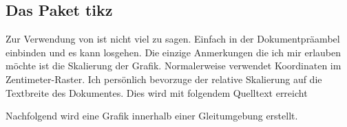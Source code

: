 \documentclass[%
  english,ngerman,%
  geometry=no,DIV=12,automark,%
]{tudscrartcl}
\begin{document}
\subsection{Das Paket tikz}
Zur Verwendung von  ist nicht viel zu sagen. Einfach in der 
Dokumentpräambel einbinden und es kann losgehen. Die einzige Anmerkungen die 
ich mir erlauben möchte ist die Skalierung der Grafik. Normalerweise verwendet 
 Koordinaten im Zentimeter-Raster. Ich persönlich bevorzuge der 
relative Skalierung auf die Textbreite des Dokumentes. Dies wird mit folgendem 
Quelltext erreicht
%
\InputHook{\renewcommand\newlength[1]{}}
\begin{Excerpt}
\newlength{\tikzunit}
\setlength{\tikzunit}{.01\textwidth}
\tikzset{x=\tikzunit,y=\tikzunit}
\end{Excerpt}
%
Nachfolgend wird eine Grafik innerhalb einer Gleitumgebung erstellt.
%
\end{document}
